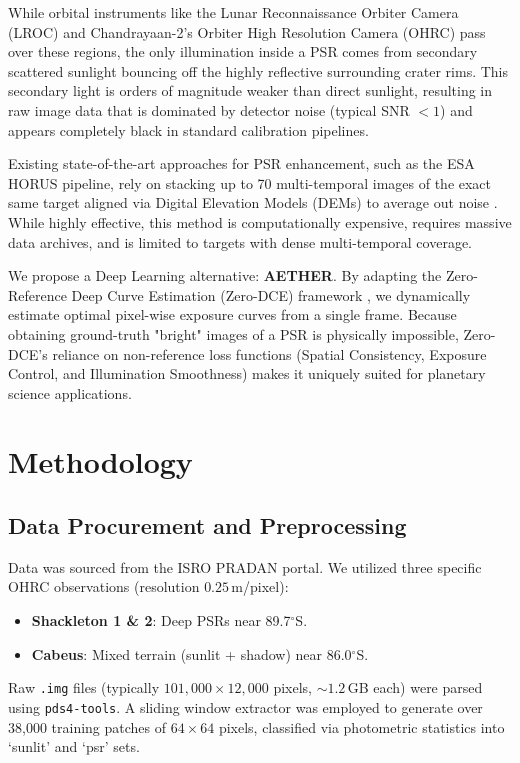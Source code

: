 \documentclass[conference]{IEEEtran}
\begin{document}
While orbital instruments like the Lunar Reconnaissance Orbiter Camera (LROC) and Chandrayaan-2's Orbiter High Resolution Camera (OHRC) pass over these regions, the only illumination inside a PSR comes from secondary scattered sunlight bouncing off the highly reflective surrounding crater rims. This secondary light is orders of magnitude weaker than direct sunlight, resulting in raw image data that is dominated by detector noise (typical SNR $< 1$) and appears completely black in standard calibration pipelines.

Existing state-of-the-art approaches for PSR enhancement, such as the ESA HORUS pipeline, rely on stacking up to 70 multi-temporal images of the exact same target aligned via Digital Elevation Models (DEMs) to average out noise \cite{horus2021}. While highly effective, this method is computationally expensive, requires massive data archives, and is limited to targets with dense multi-temporal coverage.

We propose a Deep Learning alternative: \textbf{AETHER}. By adapting the Zero-Reference Deep Curve Estimation (Zero-DCE) framework \cite{guo2020zero}, we dynamically estimate optimal pixel-wise exposure curves from a single frame. Because obtaining ground-truth "bright" images of a PSR is physically impossible, Zero-DCE's reliance on non-reference loss functions (Spatial Consistency, Exposure Control, and Illumination Smoothness) makes it uniquely suited for planetary science applications. 

\section{Methodology}

\subsection{Data Procurement and Preprocessing}
Data was sourced from the ISRO PRADAN portal. We utilized three specific OHRC observations (resolution $0.25$\,m/pixel):
\begin{itemize}
    \item \textbf{Shackleton 1 \& 2}: Deep PSRs near 89.7$^{\circ}$S.
    \item \textbf{Cabeus}: Mixed terrain (sunlit + shadow) near 86.0$^{\circ}$S.
\end{itemize}
Raw \texttt{.img} files (typically $101,000 \times 12,000$ pixels, $\sim 1.2$\,GB each) were parsed using \texttt{pds4-tools}. A sliding window extractor was employed to generate over 38,000 training patches of $64\times 64$ pixels, classified via photometric statistics into `sunlit' and `psr' sets.
\end{document}
